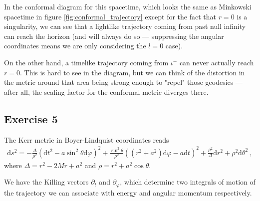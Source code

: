 \documentclass[main.tex]{subfiles}
\begin{document}
In the conformal diagram for this spacetime, which looks the same as Minkowski spacetime in figure \ref{fig:conformal_trajectory} except for the fact that \(r = 0\) is a singularity, we can see that a lightlike trajectory coming from past null infinity can reach the horizon (and will always do so --- suppressing the angular coordinates means we are only considering the \(l = 0\) case).

On the other hand, a timelike trajectory coming from \(\iota^-\) can never actually reach \(r = 0\). 
This is hard to see in the diagram, but we can think of the distortion in the metric around that area being strong enough to "repel" those geodesics --- after all, the scaling factor for the conformal metric diverges there.

\subsection{Exercise 5}

The Kerr metric in Boyer-Lindquist coordinates reads %
\begin{align}
\mathrm{d}s^2 = - \frac{\Delta}{\rho^2} 
\left(\mathrm{d}t^2 - a \sin^2 \theta \mathrm{d}\varphi \right)^2
+ \frac{\sin^2 \theta}{\rho^2}
\left( (r^2 + a^2) \mathrm{d}\varphi - a \mathrm{d}t\right)^2
+ \frac{\rho^2}{\Delta } \mathrm{d}r^2 + \rho^2 \mathrm{d}\theta^2
\,,
\end{align}
%
where \(\Delta = r^2 - 2Mr + a^2\) and \(\rho = r^2 + a^2 \cos \theta \).

We have the Killing vectors \(\partial_t\) and \(\partial_\varphi \), which determine two integrals of motion of the trajectory we can associate with energy and angular momentum respectively. 

\end{document}
